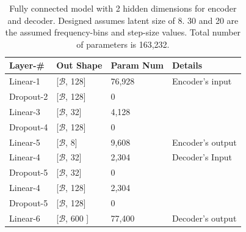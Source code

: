 \documentclass[\main/thesis.tex]{subfiles}
\begin{document}
\begin{table}[h]

\begin{tabular}{|p{28mm}|p{25mm}|p{23mm}|p{50mm}|}
\hline
Layer-\# & Out Shape & Param Num & Details  \\ \hline
Linear-1 & [$\mathcal{B}$, 128]  & 76,928 & Encoder's input \\ \hline
Dropout-2 & [$\mathcal{B}$, 128] & 0 &  \\ \hline
Linear-3 & [$\mathcal{B}$, 32]  & 4,128 & \\ \hline
Dropout-4 & [$\mathcal{B}$, 128] & 0 &  \\ \hline
Linear-5 & [$\mathcal{B}$, 8] & 9,608 & Encoder's output \\ \hline
Linear-4 & [$\mathcal{B}$, 32] & 2,304 & Decoder's Input \\ \hline
Dropout-5 & [$\mathcal{B}$, 32]  & 0 &  \\ \hline
Linear-4 & [$\mathcal{B}$, 128] & 2,304 & \\ \hline
Dropout-5 & [$\mathcal{B}$, 128]  & 0 &  \\ \hline
Linear-6  & [$\mathcal{B}$, 600 ] &  77,400 &Decoder's output\\ \hline
\end{tabular}
\caption{Fully connected model with 2 hidden dimensions for encoder and decoder. Designed assumes latent size of 8. 30 and 20 are the assumed frequency-bins and step-size values. Total number of parameters is 163,232.}
\label{table:FC2_AUTOENCODER}
\end{table}
\end{document}
